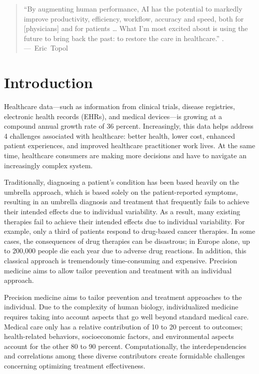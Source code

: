 \documentclass{scrartcl}
\begin{document}
\begin{quote}
``By augmenting human performance, AI has the potential to markedly improve productivity, efficiency, workflow, accuracy and speed, both for [physicians] and for patients … What I’m most excited about is using the future to bring back the past: to restore the care in healthcare.'' . \mbox{--- Eric Topol}
\end{quote}

\section{Introduction}
\label{sec:orgb1d3da6}

Healthcare data—such as information from clinical trials, disease registries, electronic health records (EHRs), and medical devices—is growing at a compound annual growth rate of 36 percent. Increasingly, this data helps address 4 challenges associated with healthcare: better health, lower cost, enhanced patient experiences, and improved healthcare practitioner work lives. At the same time, healthcare consumers are making more decisions and have to navigate an increasingly complex system.

Traditionally, diagnosing a patient’s condition has been based heavily on the umbrella approach, which is based solely on the patient-reported symptoms, resulting in an umbrella diagnosis and treatment that frequently fails to achieve their intended effects due to individual variability. As a result, many existing therapies fail to achieve their intended effects due to individual variability. For example, only a third of patients respond to drug-based cancer therapies. In some cases, the consequences of drug therapies can be disastrous; in Europe alone, up to 200,000 people die each year due to adverse drug reactions. In addition, this classical approach is tremendously time-consuming and expensive. Precision medicine aims to allow tailor prevention and treatment with an individual approach.

Precision medicine aims to tailor prevention and treatment approaches to the individual. Due to the complexity of human biology, individualized medicine requires taking into account aspects that go well beyond standard medical care. Medical care only has a relative contribution of 10 to 20 percent to outcomes; health-related behaviors, socioeconomic factors, and environmental aspects account for the other 80 to 90 percent. Computationally, the interdependencies and correlations among these diverse contributors create formidable challenges concerning optimizing treatment effectiveness.
\end{document}
